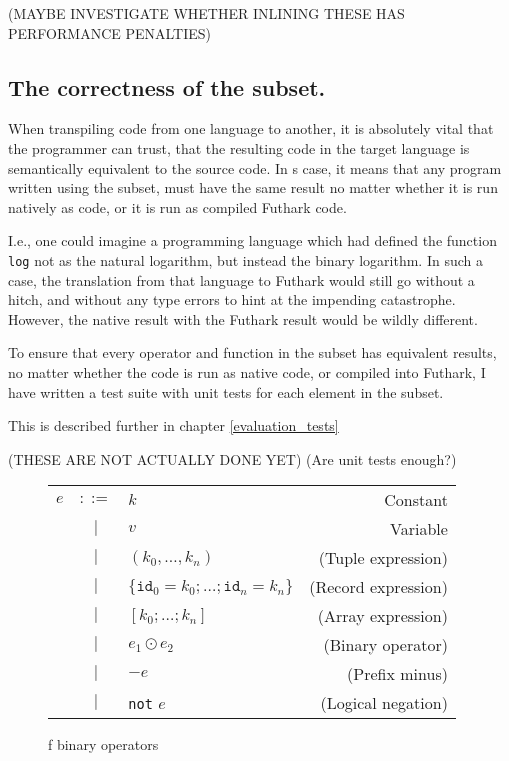 (MAYBE INVESTIGATE WHETHER INLINING THESE HAS PERFORMANCE PENALTIES) 


\subsection*{The correctness of the \fshark{} subset.}
When transpiling code from one language to another, it is absolutely vital that
the programmer can trust, that the resulting code in the target language is
semantically equivalent to the source code.
In \fshark{}s case, it means that any program written using the \fshark{}
subset, must have the same result no matter whether it is run natively as
\fsharp{} code, or it is run as \fshark{} compiled Futhark code.

I.e., one could imagine a programming language which had defined the function
\texttt{log} not as the natural logarithm, but instead the binary logarithm. In
such a case, the translation from that language to Futhark would still go
without a hitch, and without any type errors to hint at the impending
catastrophe.
However, the native result with the Futhark result would be wildly different.

To ensure that every operator and function in the \fshark{} subset has
equivalent results, no matter whether the \fshark{} code is run as native
\fsharp{} code, or compiled into Futhark, I have written a test suite with unit
tests for each element in the \fsharp{} subset. 

This is described further in chapter \ref{evaluation_tests}

(THESE ARE NOT ACTUALLY DONE YET)
(Are unit tests enough?)









\begin{figure}
  \centering
  \begin{tabular}{lclr}
    $e$ & $::=$ & $k$ & Constant \\
        & $|$   & $v$ & Variable \\
        & $|$   & $(k_0 , \ldots , k_n)$ & (Tuple expression) \\
        & $|$   & $\{\texttt{id}_0=k_0 ; \ldots ; \texttt{id}_n=k_n\}$ & (Record expression) \\
        & $|$   & $[k_0 ; \ldots ; k_n]$ & (Array expression) \\
        & $|$   & $e_1 \odot e_2$ & (Binary operator) \\
        & $|$   & $-e$ & (Prefix minus) \\
        & $|$   & \texttt{not} $e$ & (Logical negation) \\
  \end{tabular}
  \caption{f binary operators}
\end{figure}

